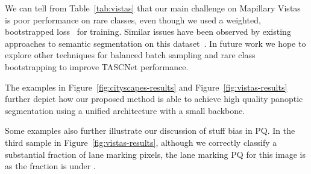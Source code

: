 \documentclass[10pt,twocolumn]{article}
\begin{document}
We can tell from Table~\ref{tab:vistas} that our main challenge on Mapillary Vistas is poor performance on rare classes, even though we used a weighted, bootstrapped loss~\cite{reed2014BCE} for training. Similar issues have been observed by existing approaches to semantic segmentation on this dataset~\cite{liulsun}. In future work we hope to explore other techniques for balanced batch sampling and rare class bootstrapping to improve TASCNet performance.



The examples in Figure~\ref{fig:cityscapes-results} and Figure~\ref{fig:vistas-results} further depict how our proposed method is able to achieve high quality panoptic segmentation using a unified architecture with a small backbone. 

Some examples also further illustrate our discussion of stuff bias in \ac{PQ}. In the third sample in Figure~\ref{fig:vistas-results}, although we correctly classify a substantial fraction of lane marking pixels, the lane marking \ac{PQ} for this image is  as the fraction is under .
\end{document}
